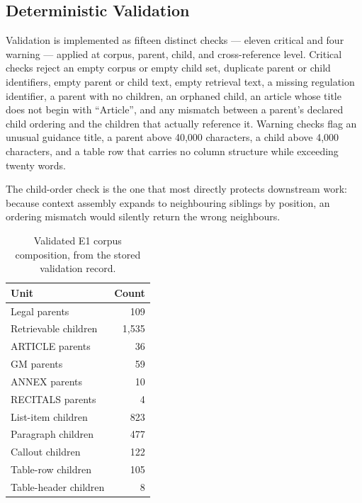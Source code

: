 \subsection{Deterministic Validation}

Validation is implemented as fifteen distinct checks --- eleven critical and four warning --- applied at corpus, parent, child, and cross-reference level. Critical checks reject an empty corpus or empty child set, duplicate parent or child identifiers, empty parent or child text, empty retrieval text, a missing regulation identifier, a parent with no children, an orphaned child, an article whose title does not begin with ``Article'', and any mismatch between a parent's declared child ordering and the children that actually reference it. Warning checks flag an unusual guidance title, a parent above 40{,}000 characters, a child above 4{,}000 characters, and a table row that carries no column structure while exceeding twenty words.

The child-order check is the one that most directly protects downstream work: because context assembly expands to neighbouring siblings by position, an ordering mismatch would silently return the wrong neighbours.

\begin{table}[htbp]
  \centering
  \caption{Validated E1 corpus composition, from the stored validation record.}
  \label{tab:e1-corpus}
  \begin{tabular}{lr}
    \toprule
    \textbf{Unit} & \textbf{Count} \\
    \midrule
    Legal parents & 109 \\
    Retrievable children & 1,535 \\
    \midrule
    ARTICLE parents & 36 \\
    GM parents & 59 \\
    ANNEX parents & 10 \\
    RECITALS parents & 4 \\
    \midrule
    List-item children & 823 \\
    Paragraph children & 477 \\
    Callout children & 122 \\
    Table-row children & 105 \\
    Table-header children & 8 \\
    \bottomrule
  \end{tabular}
\end{table}

